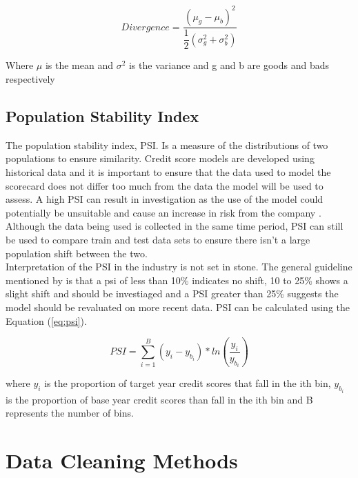 \begin{equation}\label{eq:divergence}
Divergence = \dfrac{(\mu_g - \mu_b)^2}{\dfrac{1}{2} (\sigma_g^2 + \sigma_b^2)}
\end{equation}

Where $\mu$ is the mean and $\sigma^2$ is the variance and g and b are goods and bads respectively

\subsection*{Population Stability Index}

The population stability index, PSI. Is a measure of the distributions of two populations to ensure similarity. Credit score models are developed using historical data and it is important to ensure that the data used to model the scorecard does not differ too much from the data the model will be used to assess. A high PSI can result in investigation as the use of the model could potentially be unsuitable and cause an increase in risk from the company \parencite{yurdakul2018statistical}. Although the data being used is collected in the same time period, PSI can still be used to compare train and test data sets to ensure there isn't a large population shift between the two.\\

Interpretation of the PSI in the industry is not set in stone. The general guideline mentioned by \parencite{bailey2004credit} is that a psi of less than 10\% indicates no shift, 10 to 25\% shows a slight shift and should be investiaged and a PSI greater than 25\% suggests the model should be revaluated on more recent data. PSI can be calculated using the Equation (\ref{eq:psi})\parencite{yurdakul2018statistical}.

\begin{equation}\label{eq:psi}
PSI = \sum_{i=1}^{B} (y_i-y_{b_i}) * ln(\dfrac{y_i}{y_{b_i}})
\end{equation}

where $y_i$ is the proportion of target year credit scores that fall in the ith bin, $y_{b_i}$ is the proportion of base year credit scores than fall in the ith bin and B represents the number of bins.

\section{Data Cleaning Methods}

